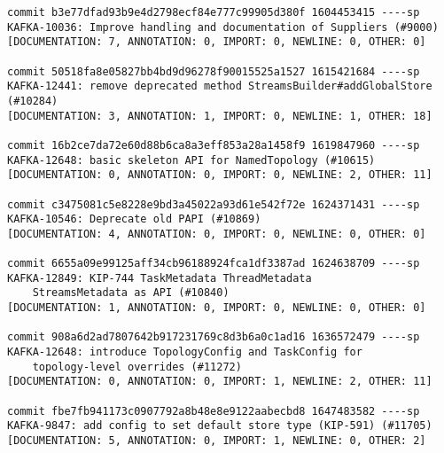 \begin{mdframed}
\begin{lstlisting}
commit b3e77dfad93b9e4d2798ecf84e777c99905d380f 1604453415 ----sp
KAFKA-10036: Improve handling and documentation of Suppliers (#9000)                                
[DOCUMENTATION: 7, ANNOTATION: 0, IMPORT: 0, NEWLINE: 0, OTHER: 0]

commit 50518fa8e05827bb4bd9d96278f90015525a1527 1615421684 ----sp
KAFKA-12441: remove deprecated method StreamsBuilder#addGlobalStore (#10284)                        
[DOCUMENTATION: 3, ANNOTATION: 1, IMPORT: 0, NEWLINE: 1, OTHER: 18]

commit 16b2ce7da72e60d88b6ca8a3eff853a28a1458f9 1619847960 ----sp
KAFKA-12648: basic skeleton API for NamedTopology (#10615)                                          
[DOCUMENTATION: 0, ANNOTATION: 0, IMPORT: 0, NEWLINE: 2, OTHER: 11]

commit c3475081c5e8228e9bd3a45022a93d61e542f72e 1624371431 ----sp
KAFKA-10546: Deprecate old PAPI (#10869)                                                            
[DOCUMENTATION: 4, ANNOTATION: 0, IMPORT: 0, NEWLINE: 0, OTHER: 0]

commit 6655a09e99125aff34cb96188924fca1df3387ad 1624638709 ----sp
KAFKA-12849: KIP-744 TaskMetadata ThreadMetadata 
    StreamsMetadata as API (#10840)
[DOCUMENTATION: 1, ANNOTATION: 0, IMPORT: 0, NEWLINE: 0, OTHER: 0]

commit 908a6d2ad7807642b917231769c8d3b6a0c1ad16 1636572479 ----sp
KAFKA-12648: introduce TopologyConfig and TaskConfig for 
    topology-level overrides (#11272)
[DOCUMENTATION: 0, ANNOTATION: 0, IMPORT: 1, NEWLINE: 2, OTHER: 11]

commit fbe7fb941173c0907792a8b48e8e9122aabecbd8 1647483582 ----sp
KAFKA-9847: add config to set default store type (KIP-591) (#11705)                                 
[DOCUMENTATION: 5, ANNOTATION: 0, IMPORT: 1, NEWLINE: 0, OTHER: 2]
\end{lstlisting}
\end{mdframed}

\endinput